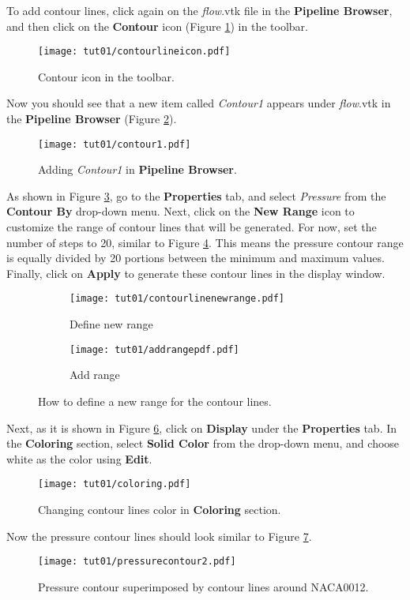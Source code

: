 To add contour lines, click again on the \textit{flow}.vtk file in the \textbf{Pipeline Browser}, and then click on the \textbf{Contour} icon (Figure \ref{fig1:contour_icon}) in the toolbar.
\begin{figure}[htbp]
    \centering
    \texttt{[image: tut01/contourlineicon.pdf]}
    \caption{Contour icon in the toolbar.}
    \label{fig1:contour_icon}
\end{figure}
Now you should see that a new item called \textit{Contour1} appears under \textit{flow}.vtk in the \textbf{Pipeline Browser} (Figure \ref{fig1:contour1}).
\begin{figure}[htbp]
    \centering
    \texttt{[image: tut01/contour1.pdf]}
    \caption{Adding \textit{Contour1} in \textbf{Pipeline Browser}.}
    \label{fig1:contour1}
\end{figure}
As shown in Figure \ref{fig1:contourby a}, go to the \textbf{Properties} tab, and select \textit{Pressure} from the \textbf{Contour By} drop-down menu. Next, click on the \textbf{New Range} icon to customize the range of contour lines that will be generated. For now, set the number of steps to 20, similar to Figure \ref{fig1:contourby b}. This means the pressure contour range is equally divided by 20 portions between the minimum and maximum values. Finally, click on \textbf{Apply} to generate these contour lines in the display window.
\begin{figure}[htbp]
    \centering
     \begin{subfigure}[b]{.4\textwidth}
         \centering
         \texttt{[image: tut01/contourlinenewrange.pdf]}
         \caption{Define new range}
         \label{fig1:contourby a}
     \end{subfigure}
     \hfill
     \begin{subfigure}[b]{.4\textwidth}
         \centering
         \texttt{[image: tut01/addrangepdf.pdf]}
         \caption{Add range}
         \label{fig1:contourby b}
     \end{subfigure}     
    \caption{How to define a new range for the contour lines.}
    \label{fig1:contourby}
\end{figure}
Next, as it is shown in Figure \ref{fig1:colorby2}, click on \textbf{Display} under the \textbf{Properties} tab. In the \textbf{Coloring} section, select \textbf{Solid Color} from the drop-down menu, and choose white as the color using \textbf{Edit}.
\begin{figure}[htbp]
    \centering
    \texttt{[image: tut01/coloring.pdf]}
    \caption{Changing contour lines color in \textbf{Coloring} section.}
    \label{fig1:colorby2}
\end{figure}
Now the pressure contour lines should look similar to Figure \ref{fig1:pressure_contour_lines}.
\begin{figure}[htbp]
    \centering
    \texttt{[image: tut01/pressurecontour2.pdf]}
    \caption{Pressure contour superimposed by contour lines around NACA0012.}
    \label{fig1:pressure_contour_lines}
\end{figure}
